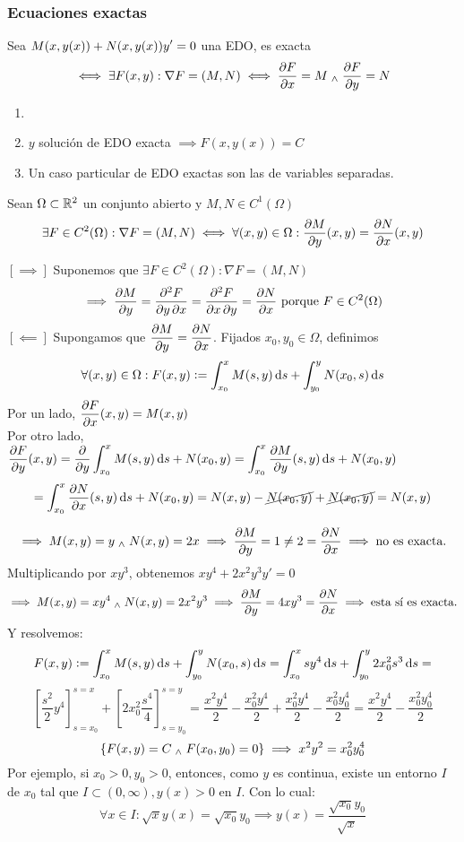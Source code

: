 \subsubsection{Ecuaciones exactas}
\begin{defn}
	Sea $\displaystyle M(x, y(x))+N(x, y(x))y'=0$ una EDO, es exacta
	\[\iff \exists F(x, y) : \nabla F=(M, N) \iff \pdv{F}{x}=M \; _{\wedge} \; \pdv{F}{y}=N\]
\end{defn}
\begin{obs}
	\begin{enumerate}[topsep=0pt, itemsep=1pt,parsep=3pt]
		\item[]
		\item $y$ solución de EDO exacta $\implies F(x, y(x))=C$
		\item Un caso particular de EDO exactas son las de variables separadas.
	\end{enumerate}
\end{obs}

\begin{prop}
	Sean $\Omega\subset \mathbb{R}^2$ un conjunto abierto y $M, N \in C^1(\Omega)$
	\[\exists F \in C^2(\Omega) : \nabla F=(M,N) \iff \forall (x,y) \in \Omega :\pdv{M}{y}(x,y)=\pdv{N}{x}(x,y)\]
	\begin{dem}
		$[\implies]$ Suponemos que $\exists F \in C^2(\Omega):\nabla F = (M, N)$
		\[\implies \pdv{M}{y}=\pdv{F}{y, x}=\pdv{F}{x, y}=\pdv{N}{x} \text{ porque } F \in C^2(\Omega) \]
		$[\impliedby]$ Supongamos que $\displaystyle\pdv{M}{y}=\pdv{N}{x}$. Fijados $x_0, y_0 \in \Omega$, definimos
		\[\forall (x, y) \in \Omega : F(x, y)\defeq \int_{x_0}^xM(s,y)\odif{s}+ \int_{y_0}^yN(x_0,s)\odif{s}\]
		Por un lado, $\displaystyle \pdv{F}{x}(x,y)=M(x,y)$ \\
		Por otro lado, $\ds \pdv{F}{y}(x, y)=\pdv{}{y} \int_{x_0}^x M(s,y) \odif{s} + N(x_0, y) = \int_{x_0}^x \pdv{M}{y}(s,y)\odif{s} + N(x_0, y)$
		\[\ds= \int_{x_0}^x \pdv{N}{x}(s,y)\odif{s} + N(x_0, y)=N(x,y)-\cancel{N(x_0, y)}+ \cancel{N(x_0, y)}=N(x,y)\]
	\end{dem}
\end{prop}

\begin{ejem}[$y+2xy'=0$]
	\[\implies M(x, y)=y \; _{\wedge} \; N(x,y) = 2x \implies \pdv{M}{y}=1 \ne 2 = \pdv{N}{x} \implies \text{no es exacta.}\]
	Multiplicando por $xy^3$, obtenemos $xy^4+2x^2y^3y'=0$
	\[\implies M(x, y)=xy^4 \; _{\wedge} \; N(x,y)=2x^2y^3 \implies \pdv{M}{y}=4xy^3 = \pdv{N}{x}\implies \text{esta sí es exacta.}\]
	Y resolvemos:
	\[F(x, y)\defeq \int_{x_0}^xM(s,y)\odif{s}+\int_{y_0}^yN(x_0,s)\odif{s} = \int_{x_0}^xsy^4\odif{s}+\int_{y_0}^y2x_0^2s^3\odif{s}=\]
	\[\left[\frac{s^2}{2}y^4\right]_{s=x_0}^{s=x} + \left[2x_0^2\frac{s^4}{4}\right]_{s=y_0}^{s=y}=\frac{x^2y^4}{2}-\frac{x_0^2y^4}{2}+\frac{x_0^2y^4}{2}-\frac{x_0^2y_0^4}{2}=\frac{x^2y^4}{2}-\frac{x_0^2y_0^4}{2}\]
	\[\{F(x,y)=C \; _{\wedge} \; F(x_0, y_0)=0\} \implies x^2y^2=x_0^2y_0^4\]
	Por ejemplo, si $x_0>0, y_0>0$, entonces, como $y$ es continua, existe un entorno $I$ de $x_0$ tal que $I\subset (0, \infty), y(x)>0$ en $I$. Con lo cual:
	\[\forall x \in I : \sqrt{x}y(x)=\sqrt{x_0}y_0 \implies \boxed{y(x)=\frac{\sqrt{x_0}y_0}{\sqrt{x}}}\]
\end{ejem}

